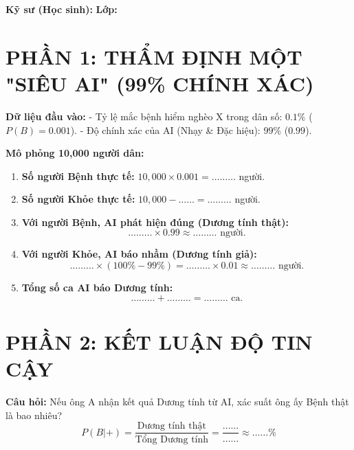 \documentclass[12pt,a4paper]{article}
\begin{document}
\begin{center}
    \vspace{0.5cm}
\end{center}

\noindent \textbf{Kỹ sư (Học sinh):} \dotfill \textbf{Lớp:} \dotfill

\section*{\color{medblue} PHẦN 1: THẨM ĐỊNH MỘT "SIÊU AI" (99\% CHÍNH XÁC)}
\textbf{Dữ liệu đầu vào:}
- Tỷ lệ mắc bệnh hiểm nghèo X trong dân số: $0.1\%$ ($P(B) = 0.001$).
- Độ chính xác của AI (Nhạy \& Đặc hiệu): $99\%$ ($0.99$).

\textbf{Mô phỏng 10,000 người dân:}
\begin{enumerate}
    \item \textbf{Số người Bệnh thực tế:} $10,000 \times 0.001 = \dots\dots\dots$ người.
    \item \textbf{Số người Khỏe thực tế:} $10,000 - \dots\dots = \dots\dots\dots$ người.
    \item \textbf{Với người Bệnh, AI phát hiện đúng (Dương tính thật):}
    $$ \dots\dots\dots \times 0.99 \approx \dots\dots\dots \text{ người.} $$
    \item \textbf{Với người Khỏe, AI báo nhầm (Dương tính giả):}
    $$ \dots\dots\dots \times (100\% - 99\%) = \dots\dots\dots \times 0.01 \approx \dots\dots\dots \text{ người.} $$
    \item \textbf{Tổng số ca AI báo Dương tính:}
    $$ \dots\dots\dots + \dots\dots\dots = \dots\dots\dots \text{ ca.} $$
\end{enumerate}

\section*{\color{medblue} PHẦN 2: KẾT LUẬN ĐỘ TIN CẬY}
\textbf{Câu hỏi:} Nếu ông A nhận kết quả Dương tính từ AI, xác suất ông ấy Bệnh thật là bao nhiêu?
$$ P(B|+) = \frac{\text{Dương tính thật}}{\text{Tổng Dương tính}} = \frac{\dots\dots}{\dots\dots} \approx \dots\dots \% $$
\end{document}

